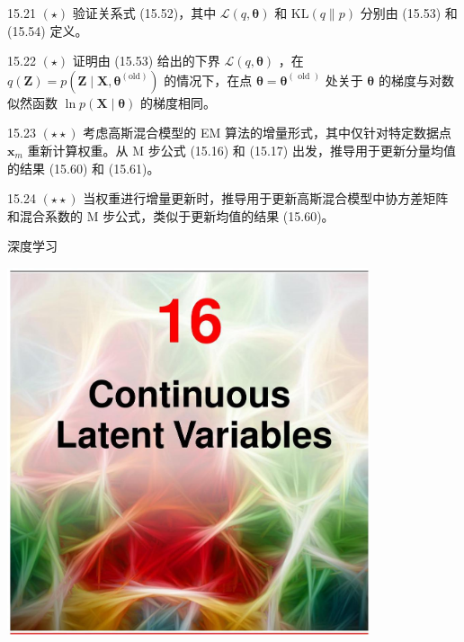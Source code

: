 \documentclass[10pt]{article}
\begin{document}
15.21 \(\left( \star \right)\) 验证关系式 (15.52)，其中 \(\mathcal{L}\left( {q,\mathbf{\theta }}\right)\) 和 \(\mathrm{{KL}}\left( {q\parallel p}\right)\) 分别由 (15.53) 和 (15.54) 定义。

15.22 \(\left( \star \right)\) 证明由 (15.53) 给出的下界 \(\mathcal{L}\left( {q,\mathbf{\theta }}\right)\) ，在 \(q\left( \mathbf{Z}\right)  = p\left( {\mathbf{Z} \mid  \mathbf{X},{\mathbf{\theta }}^{\left( \mathrm{{old}}\right) }}\right)\) 的情况下，在点 \(\mathbf{\theta } = {\mathbf{\theta }}^{\left( \text{ old }\right) }\) 处关于 \(\mathbf{\theta }\) 的梯度与对数似然函数 \(\ln p\left( {\mathbf{X} \mid  \mathbf{\theta }}\right)\) 的梯度相同。

15.23 \(\left( {\star  \star  }\right)\) 考虑高斯混合模型的 EM 算法的增量形式，其中仅针对特定数据点 \({\mathbf{x}}_{m}\) 重新计算权重。从 M 步公式 (15.16) 和 (15.17) 出发，推导用于更新分量均值的结果 (15.60) 和 (15.61)。

15.24 \(\left( {\star  \star  }\right)\) 当权重进行增量更新时，推导用于更新高斯混合模型中协方差矩阵和混合系数的 M 步公式，类似于更新均值的结果 (15.60)。

深度学习

\begin{center}
\includegraphics[max width=0.8\textwidth]{images/0194e279-9b28-703a-88f4-c3ac21e2010d_514_473_348_1076_1089_0.jpg}
\end{center}
\hspace*{3em} 
\end{document}
